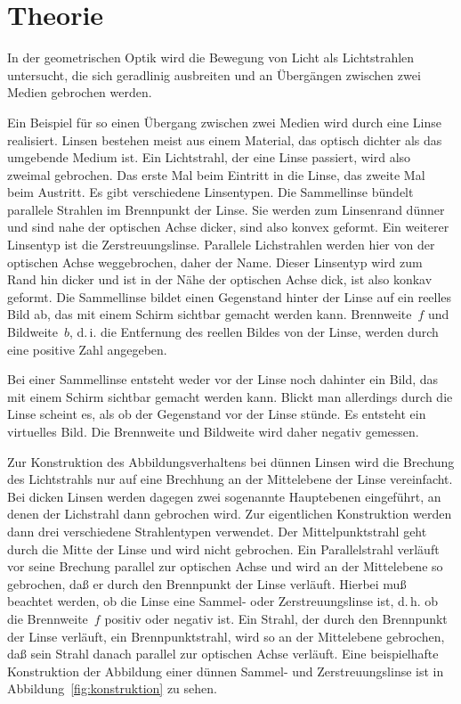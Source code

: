 
\section{Theorie}

In der geometrischen Optik wird die Bewegung von Licht als Lichtstrahlen
untersucht, die sich geradlinig ausbreiten und an Übergängen zwischen
zwei Medien gebrochen werden.

Ein Beispiel für so einen Übergang zwischen zwei Medien wird durch eine
Linse realisiert.  Linsen bestehen meist aus einem Material, das optisch
dichter als das umgebende Medium ist.  Ein Lichtstrahl, der eine Linse
passiert, wird also zweimal gebrochen.  Das erste Mal beim Eintritt in
die Linse, das zweite Mal beim Austritt.  Es gibt verschiedene
Linsentypen.  Die Sammellinse bündelt parallele Strahlen im Brennpunkt
der Linse.  Sie werden zum Linsenrand dünner und sind nahe der optischen
Achse dicker, sind also konvex geformt.  Ein weiterer Linsentyp ist die
Zerstreuungslinse.  Parallele Lichstrahlen werden hier von der optischen
Achse weggebrochen, daher der Name.  Dieser Linsentyp wird zum Rand hin
dicker und ist in der Nähe der optischen Achse dick, ist also konkav
geformt.  Die Sammellinse bildet einen Gegenstand hinter der Linse auf
ein reelles Bild ab, das mit einem Schirm sichtbar gemacht werden
kann. Brennweite~$f$ und Bildweite~$b$, d.\,i. die Entfernung des
reellen Bildes von der Linse, werden durch eine positive Zahl angegeben.

Bei einer Sammellinse entsteht weder vor der Linse noch dahinter ein
Bild, das mit einem Schirm sichtbar gemacht werden kann.  Blickt man
allerdings durch die Linse scheint es, als ob der Gegenstand vor der
Linse stünde.  Es entsteht ein virtuelles Bild.  Die Brennweite und
Bildweite wird daher negativ gemessen.

Zur Konstruktion des Abbildungsverhaltens bei dünnen Linsen wird die
Brechung des Lichtstrahls nur auf eine Brechhung an der Mittelebene der
Linse vereinfacht.  Bei dicken Linsen werden dagegen zwei sogenannte
Hauptebenen eingeführt, an denen der Lichstrahl dann gebrochen wird. Zur
eigentlichen Konstruktion werden dann drei verschiedene Strahlentypen
verwendet.  Der Mittelpunktstrahl geht durch die Mitte der Linse und
wird nicht gebrochen.  Ein Parallelstrahl verläuft vor seine Brechung
parallel zur optischen Achse und wird an der Mittelebene so gebrochen,
daß er durch den Brennpunkt der Linse verläuft. Hierbei muß beachtet
werden, ob die Linse eine Sammel- oder Zerstreuungslinse ist, d.\,h. ob
die Brennweite~$f$ positiv oder negativ ist.  Ein Strahl, der durch den
Brennpunkt der Linse verläuft, ein Brennpunktstrahl, wird so an der
Mittelebene gebrochen, daß sein Strahl danach parallel zur optischen
Achse verläuft.  Eine beispielhafte Konstruktion der Abbildung einer
dünnen Sammel- und Zerstreuungslinse ist in
Abbildung~\ref{fig:konstruktion} zu sehen.

